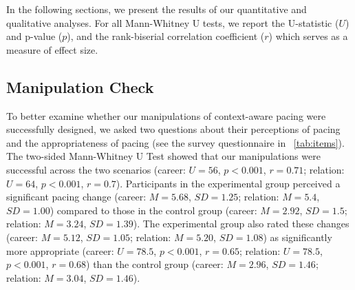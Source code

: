In the following sections, we present the results of our quantitative and qualitative analyses. For all Mann-Whitney U tests, we report the U-statistic ($U$) and p-value ($p$), and the rank-biserial correlation coefficient ($r$) which serves as a measure of effect size.

\subsection{Manipulation Check}

To better examine whether our manipulations of context-aware pacing were successfully designed, we asked two questions about their perceptions of pacing and the appropriateness of pacing (see the survey questionnaire in \tablename{~\ref{tab:items}}). The two-sided Mann-Whitney U Test showed that our manipulations were successful across the two scenarios (career: $U=56$, $p<0.001$, $r=0.71$; relation: $U=64$, $p<0.001$, $r=0.7$). Participants in the experimental group perceived a significant pacing change (career: $M=5.68$, $SD=1.25$; relation: $M=5.4$, $SD=1.00$) compared to those in the control group (career: $M=2.92$, $SD=1.5$; relation: $M=3.24$, $SD=1.39$). The experimental group also rated these changes (career: $M=5.12$, $SD=1.05$; relation: $M=5.20$, $SD=1.08$) as significantly more appropriate (career: $U=78.5$, $p<0.001$, $r=0.65$; relation: $U=78.5$, $p<0.001$, $r=0.68$) than the control group (career: $M=2.96$, $SD=1.46$; relation: $M=3.04$, $SD=1.46$). 



